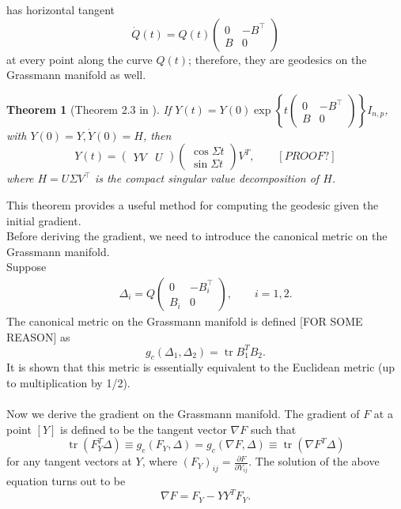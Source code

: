 \documentclass[12pt]{article}%
\newtheorem{theorem}{Theorem}
\begin{document}
has horizontal tangent
$$
\dot{Q}(t)=Q(t)\left(\begin{array}{cc}{0} & {-B^{\top}} \\ {B} & {0}\end{array}\right)
$$
at every point along the curve $Q(t)$; therefore, they are geodesics on the Grassmann manifold as well.\\
\begin{theorem}[Theorem 2.3 in \cite{Edelman1998}]
If $Y(t)=Y(0)\exp \left\{ t \left(\begin{array}{cc}0 & -B^\top \\ B & 0\end{array}\right) \right\}I_{n,p}$, with $Y(0)=Y, \dot Y(0)=H$, then
$$
Y(t)=\left(\begin{array}{ll}{Y V} & {U}\end{array}\right)\left(\begin{array}{l}{\cos \Sigma t} \\ {\sin \Sigma t}\end{array}\right) V^{T},\qquad [PROOF?]
$$
where $H=U\Sigma V^\top$ is the compact singular value decomposition of $H$.
\end{theorem}
This theorem provides a useful method for computing the geodesic given the initial gradient. \\
Before deriving the gradient, we need to introduce the canonical metric on the Grassmann manifold.\\
Suppose 
\begin{align*}
\Delta_i = Q \left( \begin{array}{cc}0 & -B_i^\top \\ B_i & 0\end{array} \right) , \qquad i=1,2.
\end{align*}
The canonical metric on the Grassmann manifold is defined [FOR SOME REASON] as
$$
g_{c}\left(\Delta_{1}, \Delta_{2}\right)=\operatorname{tr} B_{1}^{T} B_{2}.
$$
It is shown that this metric is essentially equivalent to the Euclidean metric (up to multiplication by 1/2).\\
\\
Now we derive the gradient on the Grassmann manifold.
The gradient of $F$ at a point $[Y]$ is defined to be the tangent vector $\nabla F$ such that
$$
\operatorname{tr} (F_{Y}^{T} \Delta)\equiv g_e(F_Y, \Delta)=g_{c}(\nabla F, \Delta) \equiv \operatorname{tr}(\nabla F^{T} \Delta)
$$
for any tangent vectors at $Y$, where $\left(F_{Y}\right)_{i j}=\frac{\partial F}{\partial Y_{i j}}$. The solution of the above equation turns out to be
$$
\nabla F=F_{Y}-Y Y^{T} F_{Y}.
$$


\end{document}
